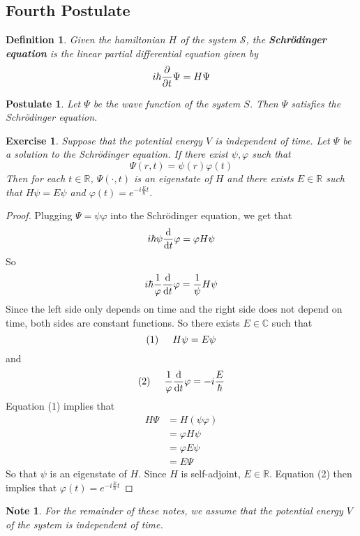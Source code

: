 \documentclass[12pt]{amsart}
\newtheorem{pos}{Postulate}
\newtheorem{defn}[thm]{Definition}
\newtheorem{note}[thm]{Note}
\newtheorem{ex}[thm]{Exercise}
\newcommand{\sch}{Schr\"{o}dinger }
\newcommand{\C}{\mathbb{C}}
\newcommand{\R}{\mathbb{R}}
\newcommand{\MS}{\mathcal{S}}
\begin{document}
\subsection{Fourth Postulate}
	\begin{defn}
		Given the hamiltonian $H$ of the system $\MS$, the \textbf{\sch equation} is the linear partial differential equation given by $$i \hbar \pdv{t} \Psi = H \Psi$$
	\end{defn}
	
	\begin{pos}
		Let $\Psi$ be the wave function of the system $S$. Then $\Psi$ satisfies the \sch equation.
	\end{pos}

	\begin{ex}
		Suppose that the potential energy $V$ is independent of time. Let $\Psi$ be a solution to the \sch equation. If there exist $\psi, \varphi$ such that $$\Psi(r,t) = \psi(r) \varphi(t)$$ Then for each $t \in \R$, $\Psi(\cdot, t)$ is an eigenstate of $H$ and there exists $E \in \R$ such that $H\psi = E \psi$ and $\varphi(t) = e^{-i\frac{E}{\hbar}t}$.
	\end{ex}

	\begin{proof}
		Plugging $\Psi = \psi \varphi$ into the \sch equation, we get that
		$$i \hbar \psi \dv{t}\varphi = \varphi H\psi$$
		So $$i \hbar \frac{1}{\varphi} \dv{t} \varphi = \frac{1}{\psi} H \psi $$ Since the left side only depends on time and the right side does not depend on time, both sides are constant functions. So there exists $E \in \C$ such that $$(1) \hspace{.5cm} H\psi = E\psi$$ and $$ (2) \hspace{.5cm} \frac{1}{\varphi}\dv{t}\varphi = -i \frac{E}{\hbar}  $$ Equation (1) implies that 
		\begin{align*}
			H \Psi 
			&= H(\psi \varphi ) \\
			&= \varphi H \psi \\
			&= \varphi E \psi \\
			&= E \Psi 
		\end{align*}
	So that $\psi$ is an eigenstate of $H$. Since $H$ is self-adjoint, $E \in \R$. Equation (2) then implies that $\varphi(t) = e^{-i\frac{E}{\hbar}t}$
	\end{proof}

	\begin{note}
		For the remainder of these notes, we assume that the potential energy $V$ of the system is independent of time. 
	\end{note}
\end{document}
